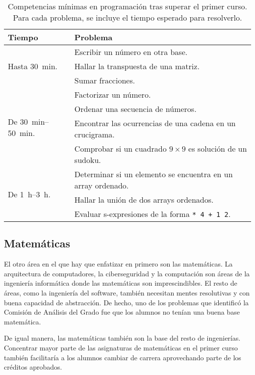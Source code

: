 \begin{table}[h]
    \centering
    \begin{tabular}{ll}
        \textbf{Tiempo} & \textbf{Problema} \\
        \hline
        \multirow{3}{*}{Hasta \SI{30}{min}.}
        & Escribir un número en otra base. \\
        & Hallar la transpuesta de una matriz. \\
        & Sumar fracciones. \\
        \hline
        \multirow{4}{*}{De \SIrange{30}{50}{min}.}
        & Factorizar un número. \\ 
        & Ordenar una secuencia de números. \\
        & Encontrar las ocurrencias de una cadena en un crucigrama. \\
        & Comprobar si un cuadrado $9\times 9$ es solución de un sudoku. \\
        \hline
        \multirow{3}{*}{De \SIrange{1}{3}{h}.}
        & Determinar si un elemento se encuentra en un array ordenado. \\
        & Hallar la unión de dos arrays ordenados. \\
        & Evaluar s-expresiones de la forma \lstinline!* 4 + 1 2!.
    \end{tabular}
    \caption{
        Competencias mínimas en programación tras superar el primer curso.
        Para cada problema, se incluye el tiempo esperado para resolverlo.
    }
    \label{tab:first-course-programming-examples}
\end{table}

\subsection{Matemáticas}

El otro área en el que hay que enfatizar en primero son las matemáticas.
La arquitectura de computadores, la ciberseguridad y la computación
son áreas de la ingeniería informática donde
las matemáticas son imprescindibles.
El resto de áreas, como la ingeniería del software,
también necesitan mentes resolutivas y con buena capacidad de abstracción.
De hecho, uno de los problemas que
identificó la Comisión de Análisis del Grado
fue que los alumnos no tenían una buena base matemática.

De igual manera,
las matemáticas también son la base del resto de ingenierías.
Concentrar mayor parte de las asignaturas de matemáticas en el primer curso
también facilitaría a los alumnos cambiar de carrera
aprovechando parte de los créditos aprobados.

